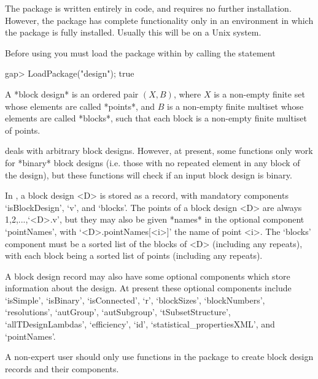 The {\DESIGN} package is written entirely in {\GAP} code, and requires
no further installation.  However, the {\DESIGN} package has complete
functionality only in an environment in which the {\GRAPE} package is
fully installed.  Usually this will be on a Unix system.


Before using {\DESIGN} you must load the package within {\GAP} by calling 
the statement

\begintt
gap> LoadPackage("design");
true
\endtt


A *block design*
is an ordered pair $(X,B)$, where
$X$ is a non-empty finite set whose elements are called *points*, and
$B$ is a non-empty finite multiset whose elements are called *blocks*,
such that each block is a non-empty finite multiset of points.

{\DESIGN} deals with arbitrary block designs. However, at present, some
{\DESIGN} functions only work for *binary* block designs
(i.e. those with no repeated element in any block of
the design), but these functions will check if an input block design
is binary.

In {\DESIGN}, a block design <D> is stored as a record, with mandatory
components `isBlockDesign', `v', and `blocks'.  The points of a block
design <D> are always 1,2,...,`<D>.v', but they may also be given *names*
in the optional component `pointNames', with `<D>.pointNames[<i>]'
the name of point <i>.  The `blocks' component must be a sorted list
of the blocks of <D> (including any repeats), with each block being a
sorted list of points (including any repeats). 

A block design record may also have some optional components which store
information about the design. At present these optional components include
`isSimple', `isBinary', `isConnected', `r', `blockSizes', `blockNumbers',
`resolutions', `autGroup', `autSubgroup', `tSubsetStructure',
`allTDesignLambdas', `efficiency', `id', `statistical_propertiesXML',
and `pointNames'.

A non-expert user should only use functions in the {\DESIGN} package to
create block design records and their components.


